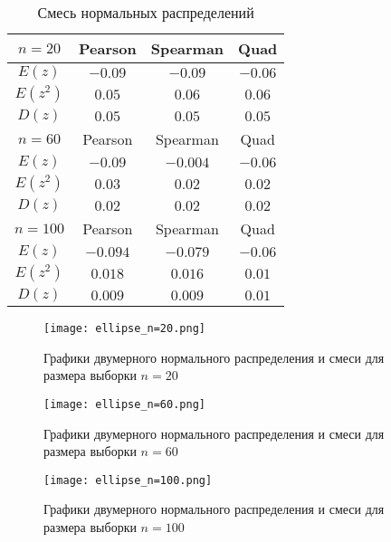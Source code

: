 \documentclass[a4]{article}
\begin{document}
\begin{table}[H]
	\caption{Смесь нормальных распределений}
	\label{tab:my_label3}
	\begin{center}
		\vspace{5mm}
		\begin{tabular}{|c|c|c|c|}
			\hline
			$ n=20 $ & Pearson & Spearman & Quad\\
			\hline
			$ E(z) $ & $ -0.09 $ & $ -0.09 $ & $ -0.06 $\\
			\hline
			$ E(z^{2}) $ & $ 0.05 $ & $ 0.06 $ & $ 0.06 $\\
			\hline
			$ D(z) $  & $ 0.05 $ & $ 0.05 $ & $ 0.05 $\\
			\hline
			$ n=60 $ & Pearson & Spearman & Quad\\
			\hline
			$ E(z) $ & $ -0.09 $ & $ -0.004 $ & $ -0.06 $\\
			\hline
			$ E(z^{2}) $ & $ 0.03 $ & $ 0.02 $ & $ 0.02 $\\
			\hline
			$ D(z) $  & $ 0.02 $ & $ 0.02 $ & $ 0.02 $ \\
			\hline
			$ n=100 $ & Pearson & Spearman & Quad\\
			\hline       
			$ E(z) $ & $ -0.094 $ & $ -0.079 $ & $ -0.06 $\\
			\hline
			$ E(z^{2}) $ & $ 0.018 $ & $ 0.016 $ & $ 0.01 $\\
			\hline
			$ D(z) $  & $ 0.009 $ & $ 0.009 $ & $ 0.01 $ \\
			\hline
		\end{tabular}
	\end{center}
\end{table}

\begin{figure}[H]
	\centering
	\caption{Графики двумерного нормального распределения и смеси для размера выборки $ n =20 $ }
	\texttt{[image: ellipse\_n=20.png]} 
	\label{fig:dis_norm_gis0}
\end{figure}

\vspace{-10cm}
\begin{figure}[H]
	\centering
	\caption{Графики двумерного нормального распределения и смеси для размера выборки $ n =60 $ }
	\texttt{[image: ellipse\_n=60.png]}
	\label{fig:dis_norm_gis1}
\end{figure}

\vspace{-1cm}
\begin{figure}[H]
	\centering
	\caption{Графики двумерного нормального распределения и смеси для размера выборки $ n =100 $ }
	\texttt{[image: ellipse\_n=100.png]} 
	\label{fig:dis_norm_gis2}
\end{figure}
\end{document}

